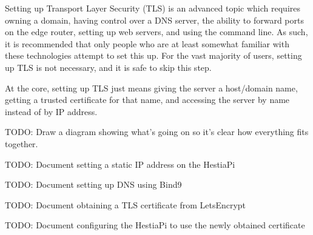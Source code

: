 Setting up Transport Layer Security (TLS) is an advanced topic which requires
owning a domain, having control over a DNS server, the ability to forward ports
on the edge router, setting up web servers, and using the command line.  As
such, it is recommended that only people who are at least somewhat familiar
with these technologies attempt to set this up.  For the vast majority of
users, setting up TLS is not necessary, and it is safe to skip this step.

At the core, setting up TLS just means giving the server a host/domain name,
getting a trusted certificate for that name, and accessing the server by name
instead of by IP address.

TODO: Draw a diagram showing what's going on so it's clear how everything fits
together.

TODO: Document setting a static IP address on the HestiaPi

TODO: Document setting up DNS using Bind9

TODO: Document obtaining a TLS certificate from LetsEncrypt

TODO: Document configuring the HestiaPi to use the newly obtained certificate

